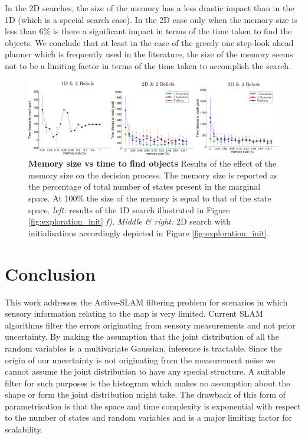 In the 2D searches, the size of the memory has a less drastic impact than in the 1D (which is a special search case). 
In the 2D case only when the memory size is less than 6\% is there a significant impact in terms of the time taken to find 
the objects. We conclude that at least in the case of the greedy one step-look ahead planner which is frequently used in the literature, the 
size of the memory seems not to be a limiting factor in terms of the time taken to accomplish the search.


\begin{figure}
  \includegraphics[width=\textwidth]{./ch5-MLMF/Figures/Figure15.pdf}
  \caption{\textbf{Memory size vs time to find objects} Results of the effect of the memory size on the decision process.
  The memory size is reported as the percentage of total number of states present in the marginal space. At 100\% the size
  of the memory is equal to that of the state space. \textit{left:} results of the 1D search illustrated in Figure \ref{fig:exploration_init} \textit{f)}.
  \textit{Middle \& right:} 2D search with initialisations accordingly depicted in Figure \ref{fig:exploration_init}.
  }
  \label{fig:time_to_reach_goal}
\end{figure}

\FloatBarrier
\section{Conclusion}\label{ch5:conclusion}

This work addresses the Active-SLAM filtering problem for scenarios in which sensory information relating to the map is very limited. Current
SLAM algorithms filter the errors originating from sensory measurements and not prior uncertainty. By making the assumption
that the joint distribution of all the random variables is a multivariate Gaussian, inference is tractable. Since the origin of 
our uncertainty is not originating from the measurement noise we cannot assume the joint distribution to have any special structure. 
A suitable filter for such purposes is the histogram which makes no assumption about the shape or form the joint distribution might take. 
The drawback of this form of parametrisation is that the space and time complexity is exponential with respect to the number of states and random variables 
and is a major limiting factor for scalability. 

